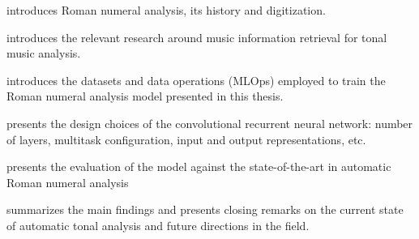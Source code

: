 
introduces Roman numeral analysis, its history and
digitization.

 introduces the relevant research around
music information retrieval for tonal music analysis.

 introduces the
datasets and data operations (MLOps) employed to train the
Roman numeral analysis model presented in this thesis.

 presents the design choices of the
convolutional recurrent neural network: number of layers,
multitask configuration, input and output representations,
etc.

 presents the evaluation of
the model against the state-of-the-art in automatic Roman
numeral analysis

 summarizes the main findings and
presents closing remarks on the current state of automatic
tonal analysis and future directions in the field.
